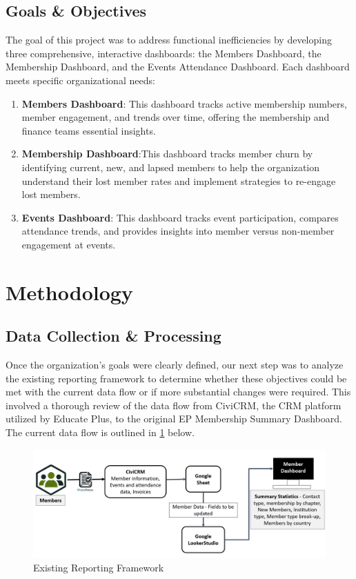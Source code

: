\documentclass[11pt,a4paper,]{article}
\begin{document}
\subsection{Goals \& Objectives}\label{goals-objectives}

The goal of this project was to address functional inefficiencies by developing three comprehensive, interactive dashboards: the Members Dashboard, the Membership Dashboard, and the Events Attendance Dashboard. Each dashboard meets specific organizational needs:

\begin{enumerate}
\def\labelenumi{\arabic{enumi}.}
\item
  \textbf{Members Dashboard}: This dashboard tracks active membership numbers, member engagement, and trends over time, offering the membership and finance teams essential insights.
\item
  \textbf{Membership Dashboard}:This dashboard tracks member churn by identifying current, new, and lapsed members to help the organization understand their lost member rates and implement strategies to re-engage lost members.
\item
  \textbf{Events Dashboard}: This dashboard tracks event participation, compares attendance trends, and provides insights into member versus non-member engagement at events.
\end{enumerate}

\section{Methodology}\label{methodology}

\subsection{Data Collection \& Processing}\label{data-collection-processing}

Once the organization's goals were clearly defined, our next step was to analyze the existing reporting framework to determine whether these objectives could be met with the current data flow or if more substantial changes were required. This involved a thorough review of the data flow from CiviCRM, the CRM platform utilized by Educate Plus, to the original EP Membership Summary Dashboard. The current data flow is outlined in \ref{fig:framework} below.

\begin{figure}[H]

{\centering \includegraphics[width=0.9\linewidth]{Images/Existing_reporting_framework} 

}

\caption{Existing Reporting Framework}\label{fig:framework}
\end{figure}
\end{document}
